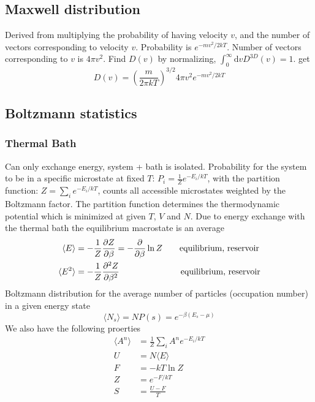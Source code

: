 \documentclass[a4paper, norsk, 8pt]{article}
\begin{document}
\begin{multicols*}{3}
\subsection*{\footnotesize  Maxwell distribution}
Derived from multiplying the probability of having velocity $v$, and the number of vectors corresponding to velocity $v$. Probability is $e^{-mv^2/2kT}$. Number of vectors corresponding to $v$ is $4\pi v^2$. Find $D(v)$ by normalizing, $\int_{0}^{\infty}\mbox{d}v D^{3D}(v)=1$. get
\begin{equation*}
    D(v) = \left(\frac{m}{2\pi k T}\right)^{3/2}4\pi v^2 e^{-mv^2/2kT}
\end{equation*}


\subsection*{\footnotesize  Boltzmann statistics}
\subsubsection*{\scriptsize Thermal Bath}
Can only exchange energy, system + bath is isolated. Probability for the system to be in a specific microstate at fixed $T$: $P_i = \frac{1}{Z}e^{-E_i/kT}$, with the partition function: $Z = \sum_{i} e^{-E_i/kT}$, counts all accessible microstates weighted by the Boltzmann factor. The partition function determines the thermodynamic potential which is minimized at given $T$, $V$ and $N$. Due to energy exchange with the thermal bath the equilibrium macrostate is an average
\begin{align*}
  \langle E \rangle &= -\frac{1}{Z}\pdv{Z}{\beta}  = -\pdv{}{\beta}\ln{Z}\qquad \text{equilibrium, reservoir}\\
  \langle E^2 \rangle &= -\frac{1}{Z}\pdv[2]{Z}{\beta}\quad \qquad \qquad \qquad \,\text{equilibrium, reservoir}
\end{align*}
Boltzmann distribution for the average number of particles (occupation number) in a given energy state
\begin{equation*}
  \langle N_s \rangle = NP(s) = e^{-\beta(E_s-\mu)}
\end{equation*}
We also have the following proerties
\begin{align*}
    \langle A^n \rangle &= \frac{1}{Z}\sum_{i} A^n e^{-E_i/kT} \\
    U &= N\langle E \rangle  \\
    F &= -kT\ln{Z} \\
    Z &= e^{-F/kT} \\
    S &= \frac{U-F}{T}
\end{align*}

\end{multicols*}
\end{document}
